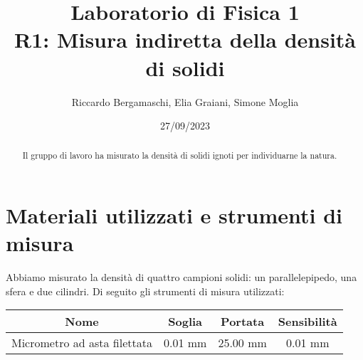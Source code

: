 \documentclass{article}
\title{
    Laboratorio di Fisica 1\\
    R1: Misura indiretta della densità di solidi
}
\author{Riccardo Bergamaschi, Elia Graiani, Simone Moglia}
\date{27/09/2023}
\begin{document}
\maketitle

\begin{abstract}
    Il gruppo di lavoro ha misurato la densità di solidi ignoti
    per individuarne la natura.
\end{abstract}

\section{Materiali utilizzati e strumenti di misura}
Abbiamo misurato la densità di quattro campioni solidi:
un parallelepipedo, una sfera e due cilindri.
Di seguito gli strumenti di misura utilizzati:

\begin{center}
    \begin{tabular}{ |c|c|c|c| }
        \hline
        Nome & Soglia & Portata & Sensibilità \\
        \hline
        Micrometro ad asta filettata & 0.01 mm & 25.00 mm & 0.01 mm \\
        \hline
    \end{tabular}
\end{center}
\end{document}
